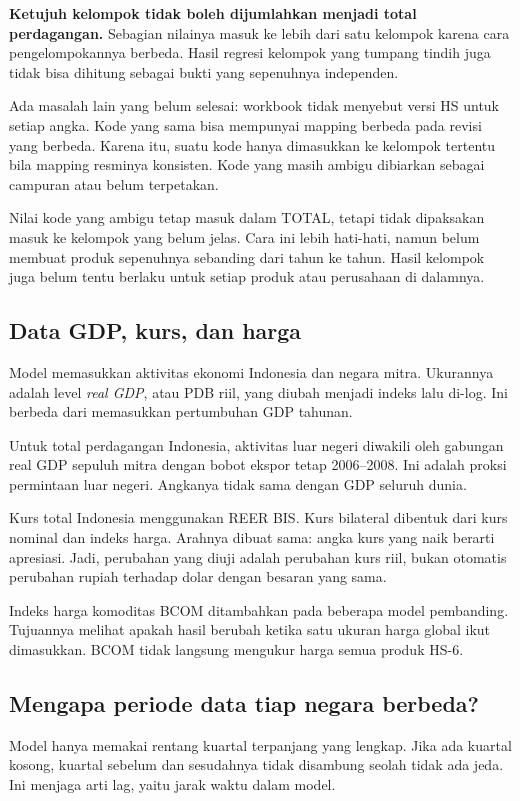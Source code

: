 \textbf{Ketujuh kelompok tidak boleh dijumlahkan menjadi total perdagangan.} Sebagian nilainya masuk ke lebih dari satu kelompok karena cara pengelompokannya berbeda. Hasil regresi kelompok yang tumpang tindih juga tidak bisa dihitung sebagai bukti yang sepenuhnya independen.

Ada masalah lain yang belum selesai: workbook tidak menyebut versi HS untuk setiap angka. Kode yang sama bisa mempunyai mapping berbeda pada revisi yang berbeda. Karena itu, suatu kode hanya dimasukkan ke kelompok tertentu bila mapping resminya konsisten. Kode yang masih ambigu dibiarkan sebagai campuran atau belum terpetakan.

Nilai kode yang ambigu tetap masuk dalam TOTAL, tetapi tidak dipaksakan masuk ke kelompok yang belum jelas. Cara ini lebih hati-hati, namun belum membuat produk sepenuhnya sebanding dari tahun ke tahun. Hasil kelompok juga belum tentu berlaku untuk setiap produk atau perusahaan di dalamnya.

\subsection{Data GDP, kurs, dan harga}
Model memasukkan aktivitas ekonomi Indonesia dan negara mitra. Ukurannya adalah level \emph{real GDP}, atau PDB riil, yang diubah menjadi indeks lalu di-log. Ini berbeda dari memasukkan pertumbuhan GDP tahunan.

Untuk total perdagangan Indonesia, aktivitas luar negeri diwakili oleh gabungan real GDP sepuluh mitra dengan bobot ekspor tetap 2006--2008. Ini adalah proksi permintaan luar negeri. Angkanya tidak sama dengan GDP seluruh dunia.

Kurs total Indonesia menggunakan REER BIS. Kurs bilateral dibentuk dari kurs nominal dan indeks harga. Arahnya dibuat sama: angka kurs yang naik berarti apresiasi. Jadi, perubahan yang diuji adalah perubahan kurs riil, bukan otomatis perubahan rupiah terhadap dolar dengan besaran yang sama.

Indeks harga komoditas BCOM ditambahkan pada beberapa model pembanding. Tujuannya melihat apakah hasil berubah ketika satu ukuran harga global ikut dimasukkan. BCOM tidak langsung mengukur harga semua produk HS-6.

\subsection{Mengapa periode data tiap negara berbeda?}
Model hanya memakai rentang kuartal terpanjang yang lengkap. Jika ada kuartal kosong, kuartal sebelum dan sesudahnya tidak disambung seolah tidak ada jeda. Ini menjaga arti lag, yaitu jarak waktu dalam model.

